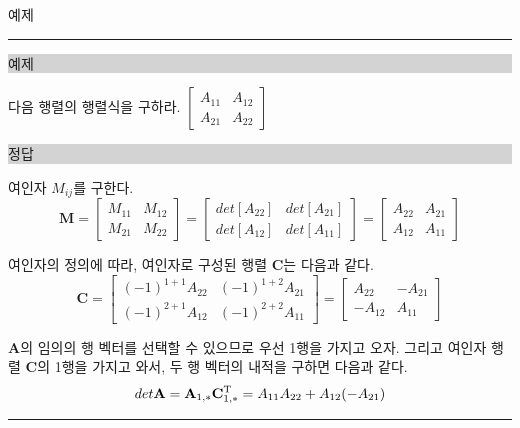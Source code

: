 \begin{frame}{예제}
\hrule

\noindent \colorbox{lightgray}{\begin{minipage}{6cm}예제\end{minipage}} 


\noindent  다음 행렬의 행렬식을 구하라.
$
\left [
\begin{array}{cc}
A_{11} & A_{12} \\
A_{21} & A_{22}
\end{array}
\right ]
$

\noindent \colorbox{lightgray}{\begin{minipage}{6cm}정답\end{minipage}} 

여인자 $M_{ij}$를 구한다.
$$
\mathbf M = 
\left [
\begin{array}{cc}
M_{11} & M_{12} \\
M_{21} & M_{22}
\end{array}
\right ] = 
\left [
\begin{array}{cc}
det \left [ A_{22} \right ] &
det \left [ A_{21} \right ] \\
det \left [ A_{12} \right ] &
det \left [ A_{11} \right ] 
\end{array}
\right ]
= 
\left [
\begin{array}{cc}
A_{22} & A_{21} \\
A_{12} & A_{11} 
\end{array}
\right ]
$$

여인자의 정의에 따라, 여인자로 구성된 행렬 $\mathbf C$는 다음과 같다.
$$
\mathbf C = 
\left [
\begin{array}{cc}
(-1)^{1+1} A_{22} & (-1)^{1+2} A_{21} \\
(-1)^{2+1} A_{12} & (-1)^{2+2} A_{11} 
\end{array}
\right ]
= \left [
\begin{array}{cc}
A_{22} & -A_{21} \\
-A_{12} & A_{11} 
\end{array}
\right ]
$$

$\mathbf A$의 임의의 행 벡터를 선택할 수 있으므로 우선 1행을 가지고 오자. 그리고 여인자 행렬 $\mathbf C$의 1행을 가지고 와서, 두 행 벡터의 내적을 
구하면 다음과 같다.
$$det \mathbf A  = \mathbf A_{1,*}  \mathbf C_{1,*}^{\rm T}  =  A_{11}  A_{22} +  A_{12} (-  A_{21}) $$

\hrule
\end{frame}

